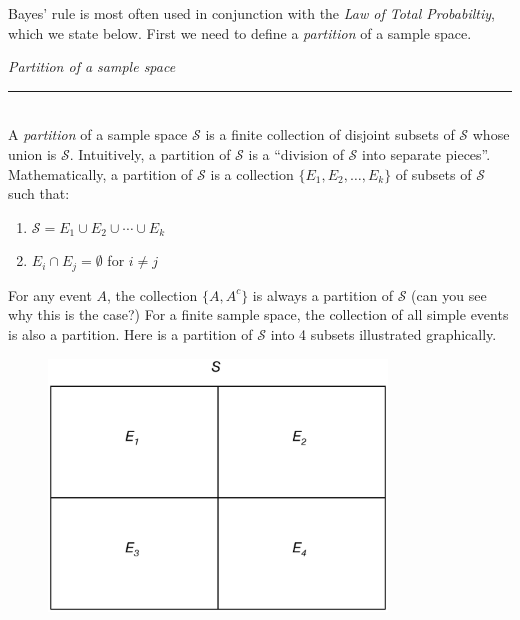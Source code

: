 \documentclass[12pt]{article}
\theoremstyle{definition}
\theoremstyle{remark}
\def\cals{{\mathcal S}}
\begin{document}
Bayes' rule is most often used in conjunction with the \emph{Law of Total Probabiltiy}, which we state below. First we need to define a \emph{partition} of a sample space.

\begin{framed}
\emph{Partition of a sample space}\\
  \rule{\dimexpr{}\fboxrule}{.1pt} \\
A \emph{partition} of a sample space $\cals$ is a finite collection of disjoint subsets of $\cals$ whose union is $\cals$. Intuitively, a partition of $\cals$ is a ``division of $\cals$ into separate pieces''. Mathematically, a partition of $\cals$ is a collection $\{E_1, E_2, \dots, E_k\}$ of subsets of $\cals$ such that:
\begin{enumerate}
\item $\cals = E_1 \cup E_2 \cup \cdots \cup E_k$
\item $E_i \cap E_j = \emptyset$ for $i \neq j$
\end{enumerate}
\end{framed}

For any event $A$, the collection $\{A, A^c\}$ is always a partition of $\cals$ (can you see why this is the case?) For a finite sample space, the collection of all simple events is also a partition. Here is a partition of $\cals$ into 4 subsets illustrated graphically.

\begin{figure}[H]
\centering
\includegraphics[width=9cm]{partition.eps}
\end{figure}
\end{document}

